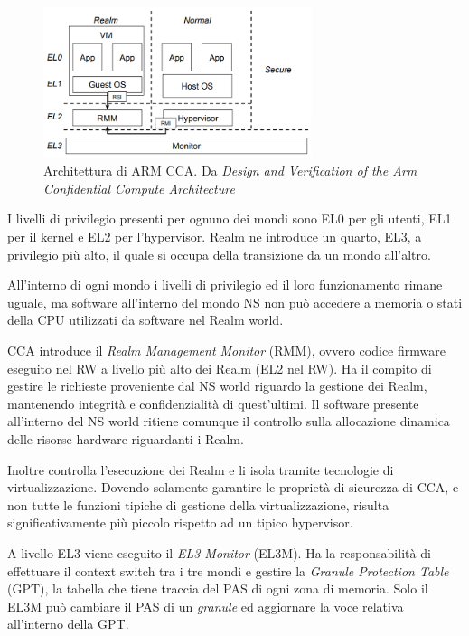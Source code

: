 \documentclass[12pt,italian]{report}
\begin{document}
	\begin{figure}[h]
		\centering
		\includegraphics[width=0.7\textwidth]{immagini/CCA_Arch}
		\caption{ Architettura di ARM CCA. Da \textit{Design and Verification of the Arm Confidential Compute Architecture} \cite{arm_cca_presentation}}
		\label{fig:cca_arch}
	\end{figure}
	
	I livelli di privilegio presenti per ognuno dei mondi sono EL0 per gli utenti, EL1 per il kernel e EL2 per l'hypervisor. Realm ne introduce un quarto, EL3, a privilegio più alto, il quale si occupa della transizione da un mondo all'altro.
	
	All'interno di ogni mondo i livelli di privilegio ed il loro funzionamento rimane uguale, ma software all'interno del mondo NS non può accedere a memoria o stati della CPU utilizzati da software nel Realm world.
	
	\bigbreak
	
	CCA introduce il \textit{Realm Management Monitor} (RMM), ovvero codice firmware eseguito nel RW a livello più alto dei Realm (EL2 nel RW). Ha il compito di gestire le richieste proveniente dal NS world riguardo la gestione dei Realm, mantenendo integrità e confidenzialità di quest'ultimi. Il software presente all'interno del NS world ritiene comunque il controllo sulla allocazione dinamica delle risorse hardware riguardanti i Realm. 
	
	Inoltre controlla l'esecuzione dei Realm e li isola tramite tecnologie di virtualizzazione. Dovendo solamente garantire le proprietà di sicurezza di CCA, e non tutte le funzioni tipiche di gestione della virtualizzazione, risulta significativamente più piccolo rispetto ad un tipico hypervisor.
	
	\bigbreak
	
	A livello EL3 viene eseguito il \textit{EL3 Monitor} (EL3M). Ha la responsabilità di effettuare il context switch tra i tre mondi e gestire la \textit{Granule Protection Table} (GPT), la tabella che tiene traccia del PAS di ogni zona di memoria. Solo il EL3M può cambiare il PAS di un \textit{granule} ed aggiornare la voce relativa all'interno della GPT.
	
\end{document}
